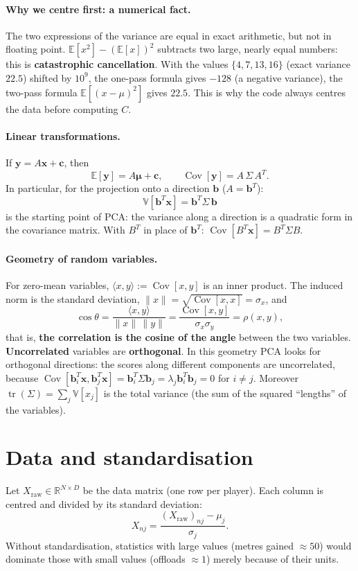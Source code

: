 \documentclass[11pt,a4paper]{article}
\theoremstyle{remark}
\newcommand{\R}{\mathbb{R}}
\newcommand{\bb}{\mathbf{b}}
\newcommand{\x}{\mathbf{x}}
\begin{document}
\paragraph{Why we centre first: a numerical fact.}
The two expressions of the variance are equal in exact arithmetic, but not in floating point.
$\mathbb{E}[x^2]-(\mathbb{E}[x])^2$ subtracts two large, nearly equal numbers: this is
\textbf{catastrophic cancellation}. With the values $\{4,7,13,16\}$ (exact variance $22.5$) shifted
by $10^9$, the one-pass formula gives $-128$ (a negative variance), the two-pass formula
$\mathbb{E}[(x-\mu)^2]$ gives $22.5$. This is why the code always centres the data before computing $C$.

\paragraph{Linear transformations.}
If $\mathbf y=A\x+\mathbf c$, then
\[
\mathbb{E}[\mathbf y]=A\boldsymbol\mu+\mathbf c,\qquad \operatorname{Cov}[\mathbf y]=A\,\Sigma\,A^T .
\]
In particular, for the projection onto a direction $\bb$ ($A=\bb^T$):
\[
\boxed{\ \mathbb{V}[\bb^T\x]=\bb^T\Sigma\,\bb\ }
\]
is the starting point of PCA: the variance along a direction is a quadratic form in the
covariance matrix. With $B^T$ in place of $\bb^T$: $\operatorname{Cov}[B^T\x]=B^T\Sigma B$.

\paragraph{Geometry of random variables.}
For zero-mean variables, $\langle x,y\rangle:=\operatorname{Cov}[x,y]$ is an inner product.
The induced norm is the standard deviation, $\|x\|=\sqrt{\operatorname{Cov}[x,x]}=\sigma_x$, and
\[
\cos\theta=\frac{\langle x,y\rangle}{\|x\|\,\|y\|}=\frac{\operatorname{Cov}[x,y]}{\sigma_x\sigma_y}=\rho(x,y),
\]
that is, \textbf{the correlation is the cosine of the angle} between the two variables.
\textbf{Uncorrelated} variables are \textbf{orthogonal}. In this geometry PCA looks for orthogonal
directions: the scores along different components are uncorrelated, because
$\operatorname{Cov}[\bb_i^T\x,\bb_j^T\x]=\bb_i^T\Sigma\bb_j=\lambda_j\bb_i^T\bb_j=0$ for $i\ne j$.
Moreover $\operatorname{tr}(\Sigma)=\sum_j\mathbb{V}[x_j]$ is the total variance (the sum of the squared
``lengths'' of the variables).

\section{Data and standardisation}
Let $X_{\text{raw}}\in\R^{N\times D}$ be the data matrix (one row per player).
Each column is centred and divided by its standard deviation:
\[
X_{nj}=\frac{(X_{\text{raw}})_{nj}-\mu_j}{\sigma_j}.
\]
Without standardisation, statistics with large values (metres gained $\approx 50$)
would dominate those with small values (offloads $\approx 1$) merely because of their units.
\end{document}
